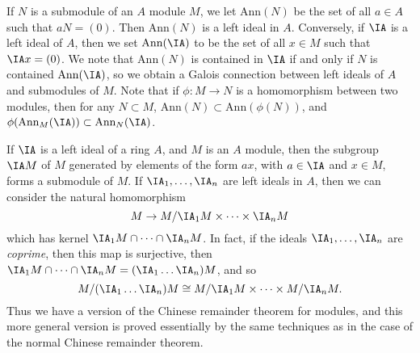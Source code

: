 \begin{example}
    If $N$ is a submodule of an $A$ module $M$, we let $\text{Ann}(N)$ be the set of all $a \in A$ such that $aN = (0)$. Then $\text{Ann}(N)$ is a left ideal in $A$. Conversely, if $\IA$ is a left ideal of $A$, then we set $\text{Ann}(\IA)$ to be the set of all $x \in M$ such that $\IA x = (0)$. We note that $\text{Ann}(N)$ is contained in $\IA$ if and only if $N$ is contained $\text{Ann}(\IA)$, so we obtain a Galois connection between left ideals of $A$ and submodules of $M$. Note that if $\phi: M \to N$ is a homomorphism between two modules, then for any $N \subset M$, $\text{Ann}(N) \subset \text{Ann}(\phi(N))$, and $\phi(\text{Ann}_M(\IA)) \subset \text{Ann}_N(\IA)$.
\end{example}

\begin{example}
    If $\IA$ is a left ideal of a ring $A$, and $M$ is an $A$ module, then the subgroup $\IA M$ of $M$ generated by elements of the form $ax$, with $a \in \IA$ and $x \in M$, forms a submodule of $M$. If $\IA_1, \dots, \IA_n$ are left ideals in $A$, then we can consider the natural homomorphism
    \[ M \to M/\IA_1 M \times \dots \times \IA_n M \]
    which has kernel $\IA_1 M \cap \dots \cap \IA_n M$. In fact, if the ideals $\IA_1, \dots, \IA_n$ are \emph{coprime}, then this map is surjective, then $\IA_1 M \cap \dots \cap \IA_n M = (\IA_1 \dots \IA_n) M$, and so
    \[ M / (\IA_1 \dots \IA_n) M \cong M/\IA_1 M \times \dots \times M/\IA_n M. \]
    Thus we have a version of the Chinese remainder theorem for modules, and this more general version is proved essentially by the same techniques as in the case of the normal Chinese remainder theorem.
\end{example}

